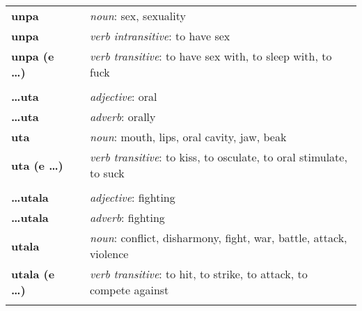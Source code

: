 \begin{supertabular}{p{2,5cm}|ll}
    \textbf{unpa}                &  & \textit{noun}: sex, sexuality                                                                              \\
    \textbf{unpa}                &  & \textit{verb intransitive}: to have sex                                                                    \\
    \textbf{unpa (e \dots)}      &  & \textit{verb transitive}: to have sex with, to sleep with, to fuck                                         \\
                                 &  &                                                                                                            \\
    \textbf{\dots uta}           &  & \textit{adjective}: oral                                                                                   \\
    \textbf{\dots uta}           &  & \textit{adverb}: orally                                                                                    \\
    \textbf{uta}                 &  & \textit{noun}: mouth, lips, oral cavity, jaw, beak                                                         \\
    \textbf{uta (e \dots)}       &  & \textit{verb transitive}: to kiss, to osculate, to oral stimulate, to suck                                 \\
                                 &  &                                                                                                            \\
    \textbf{\dots utala}         &  & \textit{adjective}: fighting                                                                               \\
    \textbf{\dots utala}         &  & \textit{adverb}: fighting                                                                                  \\
    \textbf{utala}               &  & \textit{noun}: conflict, disharmony, fight, war, battle, attack, violence                                  \\
    \textbf{utala (e \dots)}     &  & \textit{verb transitive}: to hit, to strike, to attack, to compete against                                 \\
                                 &  &                                                                                                            \\

\end{supertabular}
